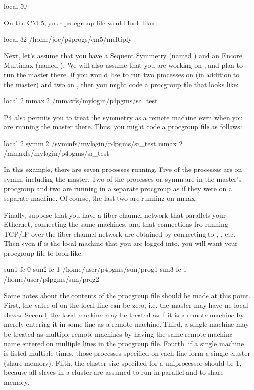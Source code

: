 \begin{example}
    local 50
\end{example}

On the CM-5, your procgroup file would look like:

\begin{example}
    local 32 /home/joe/p4progs/cm5/multiply
\end{example}

Next, let's assume that you have a Sequent Symmetry (named ) and an
Encore Multimax (named ).  We will also assume that you are working
on , and plan to run the master there.  If you would like to run
two processes on  (in addition to the master) and two on
, then you might code a procgroup file that looks like:

\begin{example}
    local 2 
    mmax  2  /mmaxfs/mylogin/p4pgms/sr_test
\end{example}

P4 also permits you to treat the symmetry as a remote machine even when 
you are running the master there.  Thus, you might code a procgroup file 
as follows:

\begin{example}
    local 2 
    symm  2  /symmfs/mylogin/p4pgms/sr_test
    mmax  2  /mmaxfs/mylogin/p4pgms/sr_test
\end{example}

In this example, there are seven processes running.  Five of the
processes are on symm, including the master.  Two of the processes on
symm are in the master's procgroup and two are running in a separate
procgroup as if they were on a separate machine.  Of course, the last
two are running on mmax.

Finally, suppose that you have a fiber-channel network that parallels your
Ethernet, connecting the same machines, and that connections fro running
TCP/IP over the fiber-channel network are obtained by connecting to
, , etc.  Then even if  is the local
machine that you are logged into, you will want your procgroup file to look
like:


\begin{example}
    sun1-fc    0
    sun2-fc    1  /home/user/p4pgms/sun/prog1
    sun3-fc    1  /home/user/p4pgms/sun/prog2
\end{example}

Some notes about the contents of the procgroup file should be made at
this point.  First, the value of  on the local line can be zero,
i.e. the master may have no local slaves.  Second, the local machine
may be treated as if it is a remote machine by merely entering it in
some line as a remote machine.  Third, a single machine may be treated
as multiple remote machines by having the same remote machine name
entered on multiple lines in the procgroup file.  Fourth, if a single
machine is listed multiple times, those processes specified on each
line form a single cluster (share memory).  Fifth, the cluster size
specified for a uniprocessor should be 1, because all slaves in a
cluster are assumed to run in parallel and to share memory.

